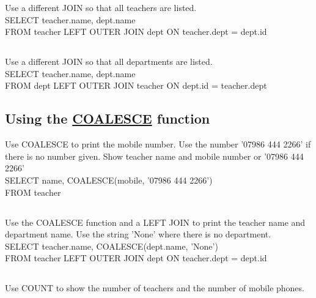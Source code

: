 \documentclass[10pt, oneside]{article}
\begin{document}
Use a different JOIN so that all teachers are listed.\\

SELECT teacher.name, dept.name\\
FROM teacher LEFT OUTER JOIN dept ON teacher.dept = dept.id\\

\subsection{}

Use a different JOIN so that all departments are listed.\\

SELECT teacher.name, dept.name\\
FROM dept LEFT OUTER JOIN teacher ON dept.id = teacher.dept\\

\subsection{Using the \hyperref{https://sqlzoo.net/wiki/COALESCE}{}{}{COALESCE} function}

Use COALESCE to print the mobile number. Use the number '07986 444 2266' if there is no number given. Show teacher name and mobile number or '07986 444 2266'\\

SELECT name, \color{red}COALESCE(mobile, '07986 444 2266')\color{black}\\
FROM teacher\\

\subsection{}

Use the COALESCE function and a LEFT JOIN to print the teacher name and department name. Use the string 'None' where there is no department.\\

SELECT teacher.name, COALESCE(dept.name, 'None')\\
FROM teacher LEFT OUTER JOIN dept ON teacher.dept = dept.id\\

\subsection{}

Use COUNT to show the number of teachers and the number of mobile phones.\\
\end{document}
